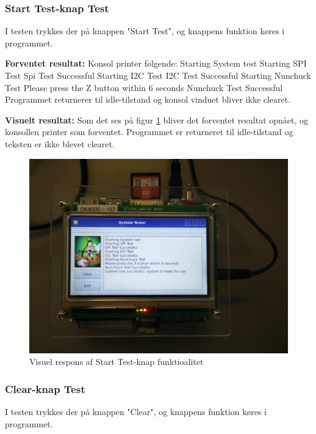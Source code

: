 \subsubsection{Start Test-knap Test}
I testen trykkes der på knappen "Start Test", og knappens funktion køres i programmet.\newline
 
\noindent\textbf{Forventet resultat:}\newline
\noindent Konsol printer følgende:\newline
Starting System test\newline
Starting SPI Test\newline
Spi Test Successful\newline
Starting I2C Test\newline
I2C Test Successful\newline
Starting Nunchuck Test\newline
Please press the Z button within 6 seconds\newline
Nunchuck Test Successful
\noindent Programmet returnerer til idle-tilstand og konsol vinduet bliver ikke clearet.\newline

\noindent\textbf{Visuelt resultat:}\newline
Som det ses på figur \ref{fig:GUIPrint} bliver det forventet resultat opnået, og konsollen printer som forventet.
Programmet er returneret til idle-tilstand og teksten er ikke blevet clearet. 

\begin{figure}[H]
	\centering
	\includegraphics[width=.5\textwidth]{Test/images/GUITest/TestPrint.jpg}
	\caption{Visuel respons af Start Test-knap funktioalitet}
	\label{fig:GUIPrint}
\end{figure}

\subsubsection{Clear-knap Test}
I testen trykkes der på knappen "Clear", og knappens funktion køres i programmet.\newline


